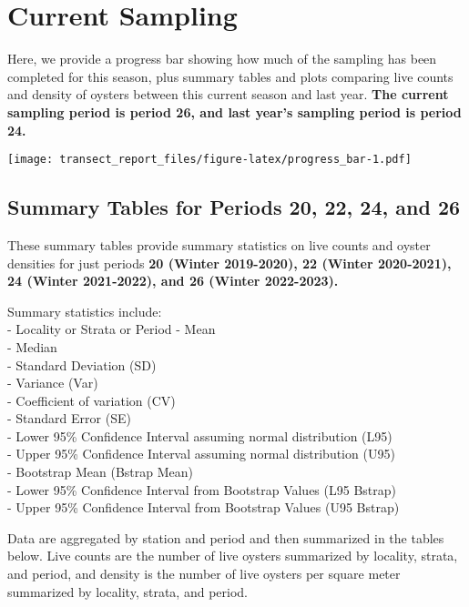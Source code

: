 \documentclass[
]{article}
\begin{document}
\endgroup

\newpage

\hypertarget{current-sampling}{%
\section{Current Sampling}\label{current-sampling}}

Here, we provide a progress bar showing how much of the sampling has
been completed for this season, plus summary tables and plots comparing
live counts and density of oysters between this current season and last
year. \textbf{The current sampling period is period 26, and last year's
sampling period is period 24.}

\texttt{[image: transect\_report\_files/figure-latex/progress\_bar-1.pdf]}

\newpage

\hypertarget{summary-tables-for-periods-20-22-24-and-26}{%
\subsection{Summary Tables for Periods 20, 22, 24, and
26}\label{summary-tables-for-periods-20-22-24-and-26}}

These summary tables provide summary statistics on live counts and
oyster densities for just periods \textbf{20 (Winter 2019-2020), 22
(Winter 2020-2021), 24 (Winter 2021-2022), and 26 (Winter 2022-2023).}

Summary statistics include:\\
- Locality or Strata or Period - Mean\\
- Median\\
- Standard Deviation (SD)\\
- Variance (Var)\\
- Coefficient of variation (CV)\\
- Standard Error (SE)\\
- Lower 95\% Confidence Interval assuming normal distribution (L95)\\
- Upper 95\% Confidence Interval assuming normal distribution (U95)\\
- Bootstrap Mean (Bstrap Mean)\\
- Lower 95\% Confidence Interval from Bootstrap Values (L95 Bstrap)\\
- Upper 95\% Confidence Interval from Bootstrap Values (U95 Bstrap)

Data are aggregated by station and period and then summarized in the
tables below. Live counts are the number of live oysters summarized by
locality, strata, and period, and density is the number of live oysters
per square meter summarized by locality, strata, and period.
\end{document}
